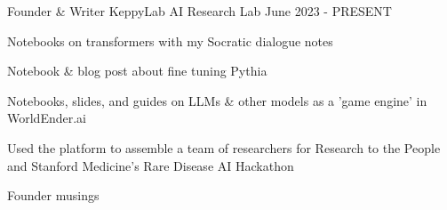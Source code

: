 

\begin{cventries}

  \cventry
    {Founder \& Writer} %
    {KeppyLab} %
    {AI Research Lab} %
    {June 2023 - PRESENT} %
    {
      \begin{cvitems} %
        \item {Notebooks on transformers with my Socratic dialogue notes}
        \item {Notebook \& blog post about fine tuning Pythia}
        \item {Notebooks, slides, and guides on LLMs \& other models as a 'game engine' in WorldEnder.ai}
        \item {Used the platform to assemble a team of researchers for Research to the People and Stanford Medicine's Rare Disease AI Hackathon}
        \item {Founder musings}
      \end{cvitems}
    }

\end{cventries}
